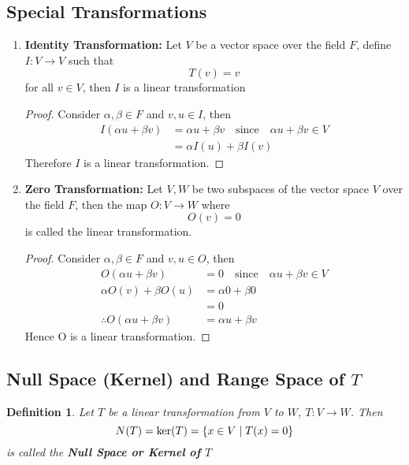 \documentclass[a4paper, titlepage]{article}
\newtheorem{definition}{Definition}[section]
\begin{document}
    \subsection{Special Transformations}
        \begin{enumerate}[label=\textbf{\arabic*}]
            \item \textbf{Identity Transformation: }Let $V$ be a vector 
            space over the field $F$, define $I: V \rightarrow V$
            such that \[ T(v) = v \] for all $v \in V$, then $I$ is a linear
            transformation
            \begin{proof}
                Consider $\alpha, \beta \in F$ and $v, u \in I$, then 
                \begin{align*}
                    I(\alpha u + \beta v) &= \alpha u + \beta v \quad 
                    \text{since} \quad \alpha u + \beta v \in V \\
                                        &= \alpha I(u) + \beta I(v)
                \end{align*}
                Therefore $I$ is a linear transformation.
            \end{proof}
            \item \textbf{Zero Transformation: }Let $V, W$ be two subspaces 
            of the vector space $V$ over the field $F$, then the map
            $O: V \rightarrow W$ where $$O(v) = 0$$ is called the 
            linear transformation.
            \begin{proof}
                Consider $\alpha, \beta \in F$ and $v, u \in O$, then 
                \begin{align*}
                    O(\alpha u + \beta v) &= 0 \quad 
                    \text{since} \quad \alpha u + \beta v \in V \\
                    \alpha O(v) + \beta O(u) &= \alpha 0 + \beta 0 \\
                                            &= 0 \\
                    \therefore O(\alpha u + \beta v) &= \alpha u + \beta v
                \end{align*}
                Hence O is a linear transformation.
            \end{proof}
        \end{enumerate}
    
    \subsection{Null Space (Kernel) and Range Space of $T$}
        \begin{definition}
            Let $T$ be a linear transformation from $V$ to $W$, 
            $T: V \rightarrow W$. Then 
            $$ N(T) = \textup{ker($T$)} = \{ x \in V \; | \; T(x) = 0 \} $$
            is called the \textbf{Null Space or Kernel of $T$}
        \end{definition}
        
\end{document}
